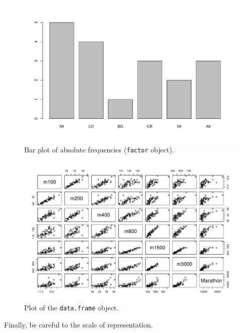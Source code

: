 \documentclass[a4paper]{article}
\begin{document}
    \begin{figure}[!htp]
        \centering
        \includegraphics[width=\textwidth]{img/visualization-of-categorical-data-3.pdf}
        \caption*{Bar plot of absolute frequencies (\texttt{factor} object).}
    \end{figure}

    \newpage

    \begin{figure}[!htp]
        \centering
        \includegraphics[width=\textwidth]{img/visualization-of-categorical-data-4.pdf}
        \caption*{Plot of the \texttt{data.frame} object.}
    \end{figure}

    \noindent
    Finally, be careful to the scale of representation.
    
\end{document}
